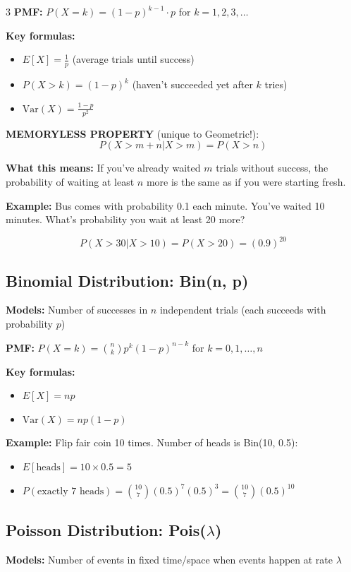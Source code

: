 \documentclass[10pt,landscape]{article}
\begin{document}
\begin{multicols}{3}
\textbf{PMF:} $P(X = k) = (1-p)^{k-1} \cdot p$ for $k = 1, 2, 3, \ldots$

\textbf{Key formulas:}
\begin{itemize}[leftmargin=*,noitemsep,topsep=0pt]
\item $E[X] = \frac{1}{p}$ (average trials until success)
\item $P(X > k) = (1-p)^k$ (haven't succeeded yet after $k$ tries)
\item $\text{Var}(X) = \frac{1-p}{p^2}$
\end{itemize}

\textbf{MEMORYLESS PROPERTY} (unique to Geometric!):
$$P(X > m + n | X > m) = P(X > n)$$

\textbf{What this means:} If you've already waited $m$ trials without success, the probability of waiting at least $n$ more is the same as if you were starting fresh.

\textbf{Example:} Bus comes with probability 0.1 each minute. You've waited 10 minutes. What's probability you wait at least 20 more?

$$P(X > 30 | X > 10) = P(X > 20) = (0.9)^{20}$$

\subsection{Binomial Distribution: Bin(n, p)}
\textbf{Models:} Number of successes in $n$ independent trials (each succeeds with probability $p$)

\textbf{PMF:} $P(X = k) = \binom{n}{k} p^k (1-p)^{n-k}$ for $k = 0, 1, \ldots, n$

\textbf{Key formulas:}
\begin{itemize}[leftmargin=*,noitemsep,topsep=0pt]
\item $E[X] = np$
\item $\text{Var}(X) = np(1-p)$
\end{itemize}

\textbf{Example:} Flip fair coin 10 times. Number of heads is Bin(10, 0.5):
\begin{itemize}[leftmargin=*,noitemsep,topsep=0pt]
\item $E[\text{heads}] = 10 \times 0.5 = 5$
\item $P(\text{exactly 7 heads}) = \binom{10}{7}(0.5)^7(0.5)^3 = \binom{10}{7}(0.5)^{10}$
\end{itemize}

\subsection{Poisson Distribution: Pois($\lambda$)}
\textbf{Models:} Number of events in fixed time/space when events happen at rate $\lambda$


\end{multicols}
\end{document}
